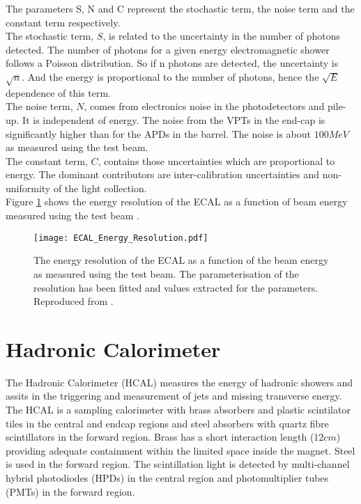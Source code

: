 The parameters S, N and C represent the stochastic term, the noise term and the
constant term respectively. \\

The stochastic term, $S$, is related to the uncertainty in the number of photons 
detected. The number of photons for a given energy electromagnetic shower 
follows a Poisson distribution. So if n photons are detected, the uncertainty is 
$\sqrt{n}$. And the energy is proportional to the number of photons, hence the 
$\sqrt{E}$ dependence of this term. \\

The noise term, $N$, comes from electronics noise in the photodetectors and
pile-up. It is independent of energy. The noise from the VPTs in the end-cap is
significantly higher than for the APDs in the barrel. The noise is about 
$100\unit{MeV}$ as measured using the test beam. \\

The constant term, $C$, contains those uncertainties which are proportional to
energy. The dominant contributors are inter-calibration uncertainties and
non-uniformity of the light collection. \\

Figure \ref{fig:ECAL_Energy_Resolution} shows the energy resolution of the ECAL
as a function of beam energy measured using the test beam \cite{cms}.

\begin{figure}
\begin{center}
\texttt{[image: ECAL\_Energy\_Resolution.pdf]}
\end{center}
\caption{The energy resolution of the ECAL as a function of the beam energy as
measured using the test beam. The parameterisation of the resolution has been 
fitted and values extracted for the parameters. Reproduced from
\cite{cms}.}
\label{fig:ECAL_Energy_Resolution}
\end{figure}

\section{Hadronic Calorimeter}

The Hadronic Calorimeter (HCAL) measures the energy of hadronic showers and
assits in the triggering and measurement of jets and missing transverse energy.
\\

The HCAL is a sampling calorimeter with brass absorbers and plastic scintilator
tiles in the central and endcap regions and steel absorbers with quartz fibre 
scintillators in the forward region. Brass has a short interaction length
($12\unit{cm}$) providing adequate containment within the limited space inside 
the magnet. Steel is used in the forward region. The scintillation light is 
detected by multi-channel hybrid photodiodes (HPDs) in the central region and 
photomultiplier tubes (PMTs) in the forward region. \\

